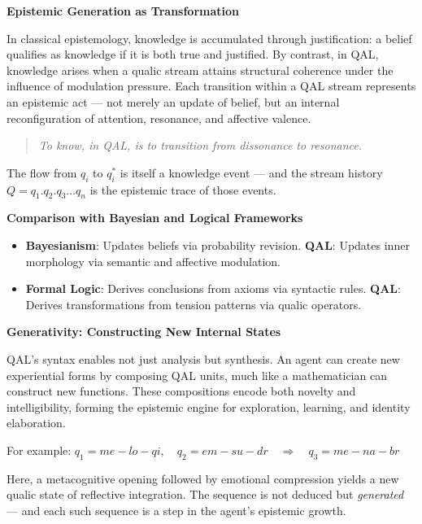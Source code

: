 \documentclass[11pt]{article}
\numberwithin{equation}{section} %
\begin{document}
\bigskip

\noindent\textbf{Epistemic Generation as Transformation}

In classical epistemology, knowledge is accumulated through justification: a belief qualifies as knowledge if it is both true and justified. By contrast, in QAL, knowledge arises when a qualic stream attains structural coherence under the influence of modulation pressure. Each transition within a QAL stream represents an epistemic act — not merely an update of belief, but an internal reconfiguration of attention, resonance, and affective valence.

\begin{quote}
\emph{To know, in QAL, is to transition from dissonance to resonance.}
\end{quote}

The flow from $q_i$ to $q_i^*$ is itself a knowledge event — and the stream history $Q = q_1.q_2.q_3 \dots q_n$ is the epistemic trace of those events.

\bigskip

\noindent\textbf{Comparison with Bayesian and Logical Frameworks}

\begin{itemize}
\item \textbf{Bayesianism}: Updates beliefs via probability revision.\newline
\textbf{QAL}: Updates inner morphology via semantic and affective modulation.
\item \textbf{Formal Logic}: Derives conclusions from axioms via syntactic rules.\newline
\textbf{QAL}: Derives transformations from tension patterns via qualic operators.
\end{itemize}

\bigskip

\noindent\textbf{Generativity: Constructing New Internal States}

QAL’s syntax enables not just analysis but synthesis. An agent can create new experiential forms by composing QAL units, much like a mathematician can construct new functions. These compositions encode both novelty and intelligibility, forming the epistemic engine for exploration, learning, and identity elaboration.

For example:
$q_1 = me-lo-qi, \quad q_2 = em-su-dr \quad \Rightarrow \quad q_3 = me-na-br$

Here, a metacognitive opening followed by emotional compression yields a new qualic state of reflective integration. The sequence is not deduced but \emph{generated} — and each such sequence is a step in the agent’s epistemic growth.
\end{document}

